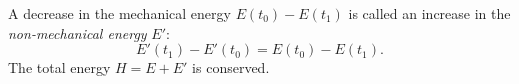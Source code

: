 A decrease in the mechanical energy $E(t_0) - E(t_1)$ is called an increase in the \textit{non-mechanical energy} $E'$:
$$E'(t_1) - E'(t_0) = E(t_0) - E(t_1).$$
The total energy $H = E + E'$ is conserved.
